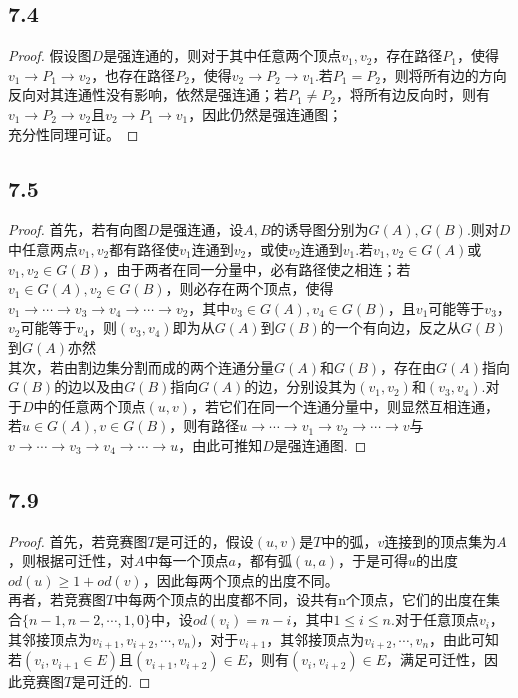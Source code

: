 \documentclass[twocolumn]{article}
\newenvironment{SChinese}{%
	\CJKfamily{gbsn}%
	\CJKtilde
	\CJKnospace}{}
\begin{document}
\begin{CJK}{UTF8}{}
\begin{SChinese}
				\subsection*{7.4}
					\begin{proof}
						假设图$D$是强连通的，则对于其中任意两个顶点$v_1,v_2$，存在路径$P_1$，使得$v_1\rightarrow P_1\rightarrow v_2$，也存在路径$P_2$，使得$v_2\rightarrow P_2\rightarrow v_1$.若$P_1=P_2$，则将所有边的方向反向对其连通性没有影响，依然是强连通；若$P_1\neq P_2$，将所有边反向时，则有$v_1\rightarrow P_2\rightarrow v_2$且$v_2\rightarrow P_1\rightarrow v_1$，因此仍然是强连通图；\\
						充分性同理可证。
					\end{proof}
				\subsection*{7.5}
					\begin{proof}
					首先，若有向图$D$是强连通，设$A,B$的诱导图分别为$G(A),G(B)$.则对$D$中任意两点$v_1,v_2$都有路径使$v_1$连通到$v_2$，或使$v_2$连通到$v_1$.若$v_1,v_2\in G(A)$或$v_1,v_2\in G(B)$，由于两者在同一分量中，必有路径使之相连；若$v_1\in G(A),v_2\in G(B)$，则必存在两个顶点，使得$v_1\rightarrow\cdots\rightarrow v_3\rightarrow v_4\rightarrow\cdots\rightarrow v_2$，其中$v_3\in G(A),v_4\in G(B)$，且$v_1$可能等于$v_3$，$v_2$可能等于$v_4$，则$(v_3,v_4)$即为从$G(A)$到$G(B)$的一个有向边，反之从$G(B)$到$G(A)$亦然\\
					其次，若由割边集分割而成的两个连通分量$G(A)$和$G(B)$，存在由$G(A)$指向$G(B)$的边以及由$G(B)$指向$G(A)$的边，分别设其为$(v_1,v_2)$和$(v_3,v_4)$.对于$D$中的任意两个顶点$(u,v)$，若它们在同一个连通分量中，则显然互相连通，若$u\in G(A),v\in G(B)$，则有路径$u\rightarrow\cdots\rightarrow v_1\rightarrow v_2\rightarrow\cdots\rightarrow v$与$v\rightarrow\cdots\rightarrow v_3\rightarrow v_4\rightarrow\cdots\rightarrow u$，由此可推知$D$是强连通图.
					\end{proof}
				\subsection*{7.9}
					\begin{proof}
						首先，若竞赛图$T$是可迁的，假设$(u,v)$是$T$中的弧，$v$连接到的顶点集为$A$，则根据可迁性，对$A$中每一个顶点$a$，都有弧$(u,a)$，于是可得$u$的出度$od(u)\ge 1+od(v)$，因此每两个顶点的出度不同。\\
						再者，若竞赛图$T$中每两个顶点的出度都不同，设共有n个顶点，它们的出度在集合$\{n-1,n-2,\cdots,1,0\}$中，设$od(v_i)=n-i$，其中$1\le i\le n$.对于任意顶点$v_i$，其邻接顶点为$v_{i+1},v_{i+2},\cdots,v_{n})$，对于$v_{i+1}$，其邻接顶点为$v_{i+2},\cdots,v_{n}$，由此可知若$(v_{i},v_{i+1}\in E)$且$(v_{i+1},v_{i+2})\in E$，则有$(v_i,v_{i+2})\in E$，满足可迁性，因此竞赛图$T$是可迁的.
					\end{proof}

\end{SChinese}
\end{CJK}
\end{document}
